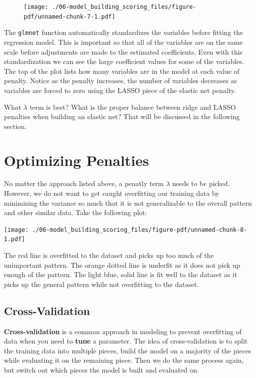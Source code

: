 \documentclass[
  letterpaper,
  DIV=11,
  numbers=noendperiod]{scrreprt}
\begin{document}
\begin{figure}[H]

{\centering \texttt{[image: ./06-model\_building\_scoring\_files/figure-pdf/unnamed-chunk-7-1.pdf]}

}

\end{figure}

The \texttt{glmnet} function automatically standardizes the variables
before fitting the regression model. This is important so that all of
the variables are on the same scale before adjustments are made to the
estimated coefficients. Even with this standardization we can see the
large coefficient values for some of the variables. The top of the plot
lists how many variables are in the model at each value of penalty.
Notice as the penalty increases, the number of variables decreases as
variables are forced to zero using the LASSO piece of the elastic net
penalty.

What \(\lambda\) term is best? What is the proper balance between ridge
and LASSO penalties when building an elastic net? That will be discussed
in the following section.

\hypertarget{optimizing-penalties}{%
\section{Optimizing Penalties}\label{optimizing-penalties}}

No matter the approach listed above, a penatly term \(\lambda\) needs to
be picked. However, we do not want to get caught overfitting our
training data by minimizing the variance so much that it is not
generalizable to the overall pattern and other similar data. Take the
following plot:

\texttt{[image: ./06-model\_building\_scoring\_files/figure-pdf/unnamed-chunk-8-1.pdf]}

The red line is overfitted to the dataset and picks up too much of the
unimportant pattern. The orange dotted line is underfit as it does not
pick up enough of the pattern. The light blue, solid line is fit well to
the dataset as it picks up the general pattern while not overfitting to
the dataset.

\hypertarget{cross-validation}{%
\subsection{Cross-Validation}\label{cross-validation}}

\textbf{Cross-validation} is a common approach in modeling to prevent
overfitting of data when you need to \textbf{tune} a parameter. The idea
of cross-validation is to split the training data into multiple pieces,
build the model on a majority of the pieces while evaluating it on the
remaining piece. Then we do the same process again, but switch out which
pieces the model is built and evaluated on.
\end{document}
